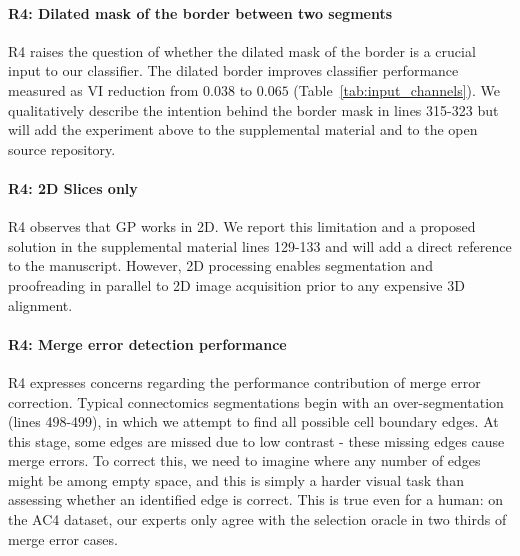 \documentclass[10pt,twocolumn,letterpaper]{article}
\begin{document}
\paragraph{R4: Dilated mask of the border between two segments} R4 raises the question of whether the dilated mask of the border is a crucial input to our classifier. The dilated border improves classifier performance measured as VI reduction from $0.038$ to $0.065$ (Table~\ref{tab:input_channels}). We qualitatively describe the intention behind the border mask in lines 315-323 but will add the experiment above to the supplemental material and to the open source repository.

\paragraph{R4: 2D Slices only} R4 observes that GP works in 2D. We report this limitation and a proposed solution in the supplemental material lines 129-133 and will add a direct reference to the manuscript. However, 2D processing enables segmentation and proofreading in parallel to 2D image acquisition prior to any expensive 3D alignment.

\paragraph{R4: Merge error detection performance} R4 expresses concerns regarding the performance contribution of merge error correction. Typical connectomics segmentations begin with an over-segmentation (lines 498-499), in which we attempt to find all possible cell boundary edges. At this stage, some edges are missed due to low contrast - these missing edges cause merge errors. To correct this, we need to imagine where any number of edges might be among empty space, and this is simply a harder visual task than assessing whether an identified edge is correct. This is true even for a human: on the AC4 dataset, our experts only agree with the selection oracle in two thirds of merge error cases.


{\small


}
\end{document}
